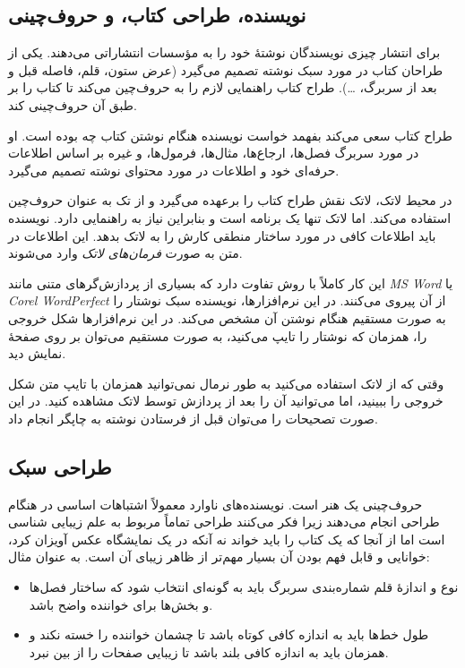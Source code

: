 \subsection{نویسنده، طراحی کتاب، و حروف‌چینی}

برای انتشار چیزی نویسندگان نوشتهٔ خود را به مؤسسات انتشاراتی می‌دهند. یکی از طراحان کتاب در مورد سبک‌ نوشته تصمیم می‌گیرد
(عرض ستون، قلم، فاصله قبل و بعد از سربرگ، \ldots).
طراح کتاب راهنمایی لازم را به حروف‌چین می‌کند تا کتاب را بر طبق آن حروف‌چینی کند.

طراح کتاب سعی می‌کند بفهمد خواست نویسنده هنگام نوشتن کتاب چه بوده است. او در مورد سربرگ فصل‌ها، ارجاع‌ها، مثال‌ها، فرمول‌ها، و 
غیره بر اساس اطلاعات حرفه‌ای خود و اطلاعات در مورد محتوای نوشته تصمیم می‌گیرد.

در محیط لاتک، لاتک نقش طراح کتاب را برعهده می‌گیرد و از تک به عنوان حروف‌چین استفاده می‌کند. اما لاتک تنها یک برنامه است و بنابراین 
نیاز به راهنمایی دارد. نویسنده باید اطلاعات کافی در مورد ساختار منطقی کارش را به لاتک بدهد. این اطلاعات در متن به صورت 
{\it فرمان‌های لاتک} 
وارد می‌شوند.

این کار کاملاً با روش 
تفاوت دارد که بسیاری از پردازش‌گرهای متنی مانند 
\emph{MS Word} یا \emph{Corel WordPerfect}
از آن پیروی می‌کنند. در این نرم‌افزارها، نویسنده سبک‌ نوشتار را به صورت مستقیم هنگام نوشتن آن مشخص می‌کند. 
در این نرم‌افزارها شکل خروجی را، همزمان که نوشتار را تایپ می‌کنید،  به صورت مستقیم می‌توان بر روی صفحهٔ نمایش دید.

وقتی که از لاتک استفاده می‌کنید به طور نرمال نمی‌توانید همزمان با تایپ متن شکل خروجی را ببینید، 
اما می‌توانید آن را بعد از پردازش توسط لاتک مشاهده کنید. در این صورت تصحیحات را می‌توان قبل از فرستادن نوشته به چاپگر انجام داد.
\subsection{طراحی سبک‌}

حروف‌چینی یک هنر است. نویسنده‌های ناوارد معمولاً اشتباهات اساسی در هنگام طراحی انجام می‌دهند زیرا فکر می‌کنند طراحی 
تماماً مربوط به علم زیبایی شناسی است  
اما از آنجا که یک کتاب را باید خواند نه آنکه در یک نمایشگاه عکس آویزان کرد، خوانایی و قابل فهم بودن آن بسیار مهم‌تر از ظاهر زیبای آن است.
به عنوان مثال: 
\begin{itemize}
\item 
نوع و اندازهٔ قلم شماره‌بندی سربرگ باید به گونه‌ای انتخاب شود که ساختار فصل‌ها و بخش‌ها برای خواننده واضح باشد.

\item
طول خط‌ها باید به اندازه کافی کوتاه باشد تا چشمان خواننده را خسته نکند و همزمان باید به اندازه کافی بلند باشد تا زیبایی صفحات را از بین نبرد.
\end{itemize}

